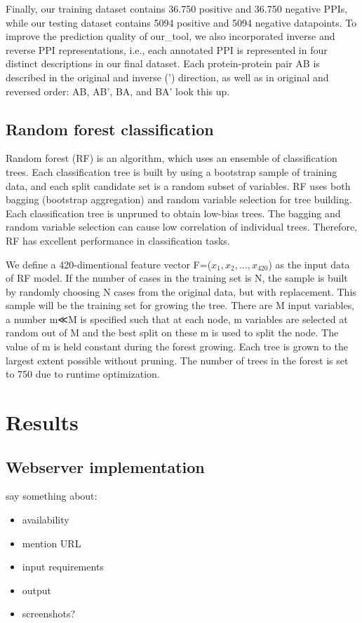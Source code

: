 \documentclass[preprint,3p,times,twocolumn]{elsarticle}
\newcommand{\TODO}[1] {\begingroup\color{red}#1\endgroup}
\begin{document}
Finally, our training dataset contains 36.750 positive and 36.750 negative PPIs, while our testing dataset contains 5094 positive and 5094 negative datapoints. To improve the prediction quality of \TODO{our\_tool}, we also incorporated inverse and reverse PPI representations, i.e., each annotated PPI is represented in four distinct descriptions in our final dataset. Each protein-protein pair AB is described in the original and inverse (') direction, as well as in original and reversed order: AB, AB', BA, and BA' \TODO{look this up}.

\subsection{Random forest classification}
Random forest (RF) is an algorithm, which uses an ensemble of classification trees. Each classification tree is built by using a bootstrap sample of training data, and each split candidate set is a random subset of variables. RF uses both bagging (bootstrap aggregation) and random variable selection for tree building. Each classification tree is unpruned to obtain low-bias trees. The bagging and random variable selection can cause low correlation of individual trees. Therefore, RF has excellent performance in classification tasks.

We define a 420-dimentional feature vector F=($x_1,x_2, \dots,x_{420}$) as the input data of RF model. If the number of cases in the training set is N, the sample is built by randomly choosing N cases from the original data, but with replacement. This sample will be the training set for growing the tree. There are M input variables, a number m≪M is specified such that at each node, m variables are selected at random out of M and the best split on these m is used to split the node. The value of m is held constant during the forest growing. Each tree is grown to the largest extent possible without pruning. \TODO{The number of trees in the forest is set to 750 due to runtime optimization.}




\section{Results}

\subsection{Webserver implementation}
say something about:
\begin{itemize}
\item availability
\item mention URL
\item input requirements
\item output
\item screenshots?
\end{itemize}
\end{document}
